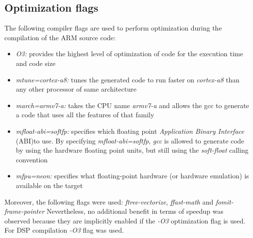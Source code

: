 \subsection{Optimization flags}

The following compiler flags are used to perform optimization during the compilation of the ARM source code:

\begin{itemize}
\item{\textit{O3:}} provides the highest level of optimization of code for the execution time and code size
\item{\textit{mtune=cortex-a8:}} tunes the generated code to run faster on \emph{cortex-a8} than any other processor of same architecture
\item{\textit{march=armv7-a:}} takes the CPU name \emph{armv7-a} and allows the gcc to generate a code that uses all the features of that family
\item{\textit{mfloat-abi=softfp:}} specifies which floating point \emph{Application Binary Interface} (ABI)to use. By specifying \emph{mfloat-abi=softfp}, \emph{gcc} is allowed to generate code by using the hardware floating point units, but still using the \emph{soft-float} calling convention
\item{\textit{mfpu=neon:}} specifies what floating-point hardware (or hardware emulation) is available on the target
\end{itemize}

Moreover, the following flags were used: \emph{ftree-vectorize}, \emph{ffast-math} and \emph{fomit-frame-pointer} Nevertheless, no additional benefit in terms of speedup was observed because they are implicitly enabled if the \emph{-O3} optimization flag is used. For DSP compilation \emph{-O3} flag was used.